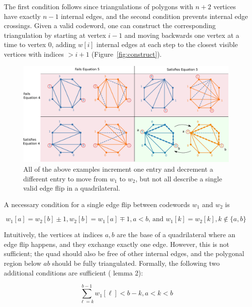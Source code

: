\documentclass[english]{socg-lipics-v2021}
\begin{document}
The first condition follows since triangulations of polygons with $n+2$ vertices have exactly $n-1$ internal edges, and the second condition prevents internal edge crossings.   Given a valid codeword, one can construct the corresponding triangulation by starting at vertex $i-1$ and moving backwards one vertex at a time to vertex $0$, adding $w[i]$ internal edges at each step to the closest visible vertices with indices $> i+1$ (Figure~\ref{fig:construct}).

\begin{figure}
    \centering
    \includegraphics[width=\textwidth]{RotationExamples.pdf}
    \caption{All of the above examples increment one entry and decrement a different entry to move from $w_1$ to $w_2$, but not all describe a single valid edge flip in a quadrilateral.}
    \label{fig:rotexamples}
\end{figure}


A necessary condition for a single edge flip between codewords $w_1$ and $w_2$ is

\begin{equation}
    \label{eq:rot1}
    w_1[a] = w_2[b] \pm 1, w_2[b] = w_1[a] \mp 1, a < b \text{, and }  w_1[k] = w_2[k], k \notin \{a, b\}
\end{equation}

Intuitively, the vertices at indices $a, b$ are the base of a quadrilateral where an edge flip happens, and they exchange exactly one edge.  However, this is not sufficient; the quad should also be free of other internal edges, and the polygonal region below $ab$ should be fully triangulated.  Formally, the following two additional conditions are sufficient (\cite{lucas1987rotation} lemma 2):

\begin{equation}
    \label{eq:rot2}
    \sum_{\ell = k}^{b-1}  w_1[\ell] < b-k, a < k < b
\end{equation}
\end{document}
